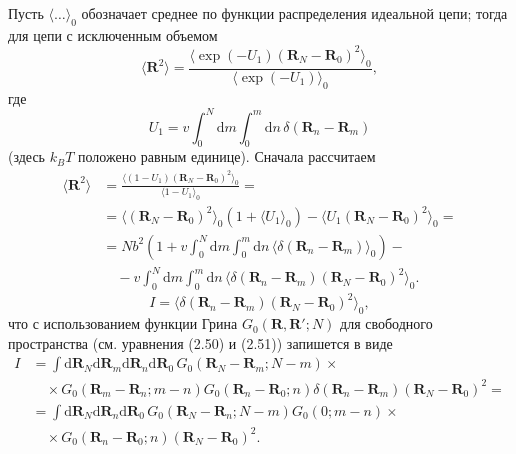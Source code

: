 \documentclass[12pt,a4paper]{article}
\begin{document}
Пусть $\langle\dots\rangle_0$ обозначает среднее по функции распределения идеальной цепи; тогда для цепи с исключенным объемом
\begin{equation}
\langle\boldsymbol{R}^2\rangle = \frac{\langle\exp(-U_1)(\boldsymbol{R}_N - \boldsymbol{R}_0)^2\rangle_0}{\langle\exp(-U_1)\rangle_0}, \tag{2.III.1}
\end{equation}
где
\begin{equation}
U_1 = v\int_0^N\!\mathrm{d}m\int_0^m\!\mathrm{d}n\,\delta(\boldsymbol{R}_n - \boldsymbol{R}_m) \tag{2.III.2}
\end{equation}
(здесь $k_B T$ положено равным единице). Сначала рассчитаем
\begin{align}
\langle\boldsymbol{R}^2\rangle &= \frac{\langle(1 - U_1)(\boldsymbol{R}_N - \boldsymbol{R}_0)^2\rangle_0}{\langle 1 - U_1\rangle_0} = \nonumber\\
&= \langle(\boldsymbol{R}_N - \boldsymbol{R}_0)^2\rangle_0(1 + \langle U_1\rangle_0) - \langle U_1(\boldsymbol{R}_N - \boldsymbol{R}_0)^2\rangle_0 = \nonumber\\
&= Nb^2\left(1 + v\int_0^N\!\mathrm{d}m\int_0^m\!\mathrm{d}n\,\langle\delta(\boldsymbol{R}_n - \boldsymbol{R}_m)\rangle_0\right) - \nonumber\\
&\quad - v\int_0^N\!\mathrm{d}m\int_0^m\!\mathrm{d}n\,\langle\delta(\boldsymbol{R}_n - \boldsymbol{R}_m)(\boldsymbol{R}_N - \boldsymbol{R}_0)^2\rangle_0. \tag{2.III.3}
\end{align}
\begin{equation}
I = \langle\delta(\boldsymbol{R}_n - \boldsymbol{R}_m)(\boldsymbol{R}_N - \boldsymbol{R}_0)^2\rangle_0, \tag{2.III.4}
\end{equation}
что с использованием функции Грина $G_0(\boldsymbol{R}, \boldsymbol{R}'; N)$ для свободного пространства (см. уравнения (2.50) и (2.51)) запишется в виде
\begin{align}
I &= \int\!\mathrm{d}\boldsymbol{R}_N\mathrm{d}\boldsymbol{R}_m\mathrm{d}\boldsymbol{R}_n\mathrm{d}\boldsymbol{R}_0\,G_0(\boldsymbol{R}_N - \boldsymbol{R}_m; N - m)\times \nonumber\\
&\quad \times G_0(\boldsymbol{R}_m - \boldsymbol{R}_n; m - n)G_0(\boldsymbol{R}_n - \boldsymbol{R}_0; n)\delta(\boldsymbol{R}_n - \boldsymbol{R}_m)(\boldsymbol{R}_N - \boldsymbol{R}_0)^2 = \nonumber\\
&= \int\!\mathrm{d}\boldsymbol{R}_N\mathrm{d}\boldsymbol{R}_n\mathrm{d}\boldsymbol{R}_0\,G_0(\boldsymbol{R}_N - \boldsymbol{R}_n; N - m)G_0(0; m - n)\times \nonumber\\
&\quad \times G_0(\boldsymbol{R}_n - \boldsymbol{R}_0; n)(\boldsymbol{R}_N - \boldsymbol{R}_0)^2. \tag{2.III.5}
\end{align}
\end{document}
